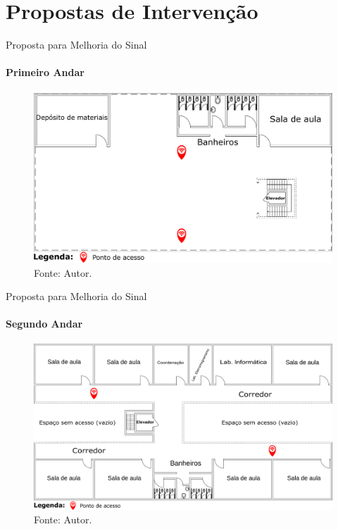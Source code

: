\documentclass[aspectratio=169,12pt]{beamer}
\begin{document}
\section{Propostas de Intervenção}
\begin{frame}{Proposta para Melhoria do Sinal}
	\framesubtitle{Primeiro Andar}
	\begin{figure}[H]
		\centering
		\includegraphics[scale=0.17]{fig_tcc/APs_Bloco_Andar_1_Proposta_Intervencao.pdf}
		\caption*{{\fontsize{8pt}{11}\selectfont Fonte: Autor.}}
	\end{figure}
\end{frame}
\begin{frame}{Proposta para Melhoria do Sinal}
	\framesubtitle{Segundo Andar}
	\begin{figure}[H]
		\centering
		\includegraphics[scale=0.13]{fig_tcc/APs_Bloco_Andar_2_Proposta_Intervencao.pdf}
		\caption*{{\fontsize{8pt}{11}\selectfont Fonte: Autor.}}
	\end{figure}
\end{frame}
\end{document}
